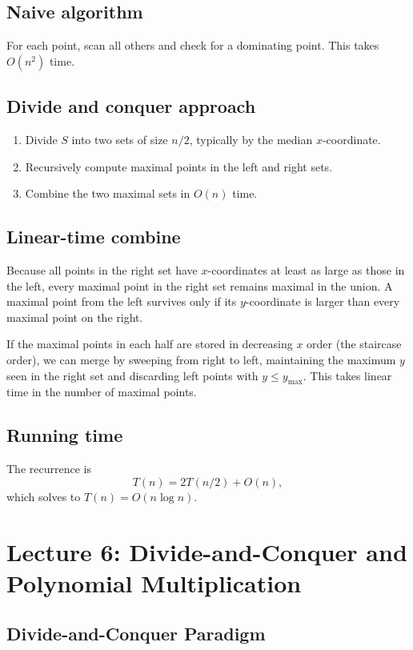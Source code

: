 \documentclass[11pt]{article}
\begin{document}
{\subsection*{Naive algorithm}
For each point, scan all others and check for a dominating point. This takes $O(n^2)$ time.

\subsection*{Divide and conquer approach}
\begin{enumerate}
\item Divide $S$ into two sets of size $n/2$, typically by the median $x$-coordinate.
\item Recursively compute maximal points in the left and right sets.
\item Combine the two maximal sets in $O(n)$ time.
\end{enumerate}

\subsection*{Linear-time combine}
Because all points in the right set have $x$-coordinates at least as large as those in the left,
every maximal point in the right set remains maximal in the union. A maximal point from the left
survives only if its $y$-coordinate is larger than every maximal point on the right.

If the maximal points in each half are stored in decreasing $x$ order (the staircase order), we can
merge by sweeping from right to left, maintaining the maximum $y$ seen in the right set and
discarding left points with $y \le y_{\max}$. This takes linear time in the number of maximal points.

\subsection*{Running time}
The recurrence is
\[
T(n) = 2T(n/2) + O(n),
\]
which solves to $T(n) = O(n \log n)$.

\section{Lecture 6: Divide-and-Conquer and Polynomial Multiplication}

\subsection*{Divide-and-Conquer Paradigm}

}
\end{document}

